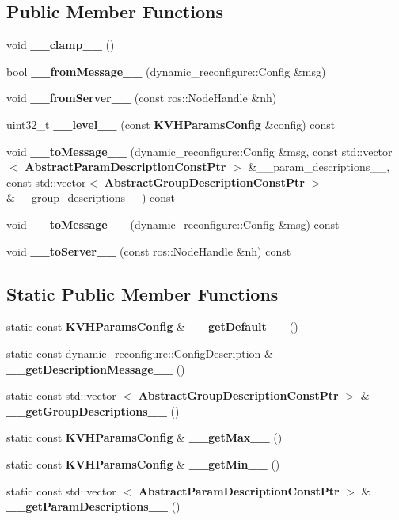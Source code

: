 \subsection*{\-Public \-Member \-Functions}
\begin{DoxyCompactItemize}
\item 
void {\bf \-\_\-\-\_\-clamp\-\_\-\-\_\-} ()
\item 
bool {\bf \-\_\-\-\_\-from\-Message\-\_\-\-\_\-} (dynamic\-\_\-reconfigure\-::\-Config \&msg)
\item 
void {\bf \-\_\-\-\_\-from\-Server\-\_\-\-\_\-} (const ros\-::\-Node\-Handle \&nh)
\item 
uint32\-\_\-t {\bf \-\_\-\-\_\-level\-\_\-\-\_\-} (const {\bf \-K\-V\-H\-Params\-Config} \&config) const 
\item 
void {\bf \-\_\-\-\_\-to\-Message\-\_\-\-\_\-} (dynamic\-\_\-reconfigure\-::\-Config \&msg, const std\-::vector$<$ {\bf \-Abstract\-Param\-Description\-Const\-Ptr} $>$ \&\-\_\-\-\_\-param\-\_\-descriptions\-\_\-\-\_\-, const std\-::vector$<$ {\bf \-Abstract\-Group\-Description\-Const\-Ptr} $>$ \&\-\_\-\-\_\-group\-\_\-descriptions\-\_\-\-\_\-) const 
\item 
void {\bf \-\_\-\-\_\-to\-Message\-\_\-\-\_\-} (dynamic\-\_\-reconfigure\-::\-Config \&msg) const 
\item 
void {\bf \-\_\-\-\_\-to\-Server\-\_\-\-\_\-} (const ros\-::\-Node\-Handle \&nh) const 
\end{DoxyCompactItemize}
\subsection*{\-Static \-Public \-Member \-Functions}
\begin{DoxyCompactItemize}
\item 
static const {\bf \-K\-V\-H\-Params\-Config} \& {\bf \-\_\-\-\_\-get\-Default\-\_\-\-\_\-} ()
\item 
static const \*
dynamic\-\_\-reconfigure\-::\-Config\-Description \& {\bf \-\_\-\-\_\-get\-Description\-Message\-\_\-\-\_\-} ()
\item 
static const std\-::vector\*
$<$ {\bf \-Abstract\-Group\-Description\-Const\-Ptr} $>$ \& {\bf \-\_\-\-\_\-get\-Group\-Descriptions\-\_\-\-\_\-} ()
\item 
static const {\bf \-K\-V\-H\-Params\-Config} \& {\bf \-\_\-\-\_\-get\-Max\-\_\-\-\_\-} ()
\item 
static const {\bf \-K\-V\-H\-Params\-Config} \& {\bf \-\_\-\-\_\-get\-Min\-\_\-\-\_\-} ()
\item 
static const std\-::vector\*
$<$ {\bf \-Abstract\-Param\-Description\-Const\-Ptr} $>$ \& {\bf \-\_\-\-\_\-get\-Param\-Descriptions\-\_\-\-\_\-} ()
\end{DoxyCompactItemize}
